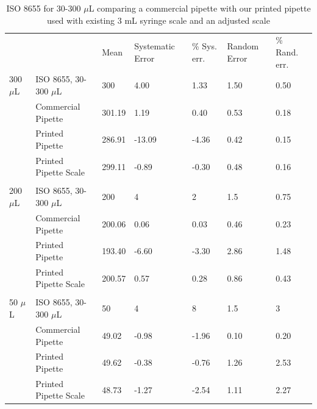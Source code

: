 \documentclass[10pt,letterpaper]{article}
\begin{document}
\begin{table}[!ht]
\begin{adjustwidth}{-2.25in}{0in} %
\centering
\caption{ISO 8655 for 30-300 $\mu$L comparing a commercial pipette with our printed pipette used with existing 3 mL syringe scale and an adjusted scale}
\label{table4}
\begin{tabular}{lllllll}
       &                       & Mean   & Systematic Error & \% Sys. err. & Random Error & \% Rand. err. \\
300 $\mu$L & ISO 8655, 30-300 $\mu$L   & 300    & 4.00             & 1.33         & 1.50         & 0.50          \\
       & Commercial Pipette    & 301.19 & 1.19             & 0.40         & 0.53         & 0.18          \\
       & Printed Pipette       & 286.91 & -13.09           & -4.36        & 0.42         & 0.15          \\
       & Printed Pipette Scale & 299.11 & -0.89            & -0.30        & 0.48         & 0.16          \\
       &                       &        &                  &              &              &               \\
200 $\mu$L & ISO 8655, 30-300 $\mu$L   & 200    & 4                & 2            & 1.5          & 0.75          \\
       & Commercial Pipette    & 200.06 & 0.06             & 0.03         & 0.46         & 0.23          \\
       & Printed Pipette       & 193.40 & -6.60            & -3.30        & 2.86         & 1.48          \\
       & Printed Pipette Scale & 200.57 & 0.57             & 0.28         & 0.86         & 0.43          \\
       &                       &        &                  &              &              &               \\
50 $\mu$L  & ISO 8655, 30-300 $\mu$L   & 50     & 4                & 8            & 1.5          & 3             \\
       & Commercial Pipette    & 49.02  & -0.98            & -1.96        & 0.10         & 0.20          \\
       & Printed Pipette       & 49.62  & -0.38            & -0.76        & 1.26         & 2.53          \\
       & Printed Pipette Scale & 48.73  & -1.27            & -2.54        & 1.11         & 2.27          \\

\end{tabular}
\end{adjustwidth}
\end{table}
\end{document}
